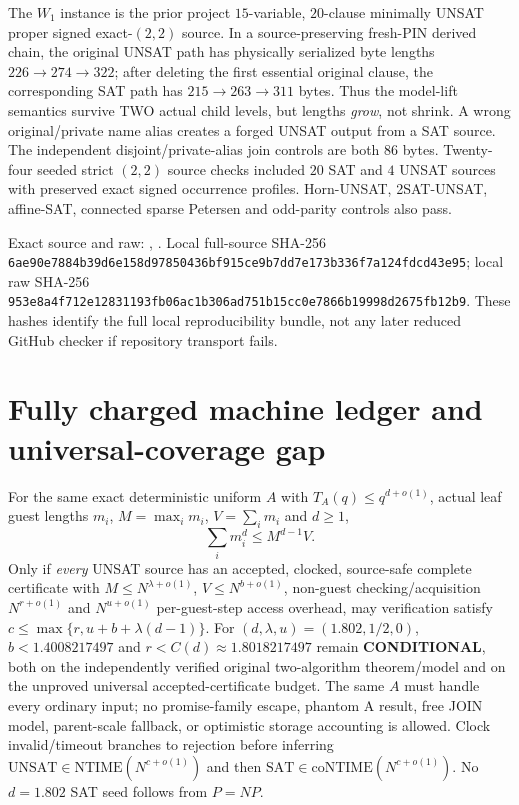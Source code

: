\documentclass[11pt]{article}
\begin{document}
The $W_1$ instance is the prior project $15$-variable,
$20$-clause minimally UNSAT proper signed exact-$(2,2)$
source. In a source-preserving fresh-PIN derived chain,
the original UNSAT path has physically serialized byte
lengths $226\to274\to322$; after deleting the first
essential original clause, the corresponding SAT path
has $215\to263\to311$ bytes. Thus the model-lift
semantics survive TWO actual child levels, but lengths
\emph{grow}, not shrink. A wrong original/private name
alias creates a forged UNSAT output from a SAT source.
The independent disjoint/private-alias join controls are
both $86$ bytes. Twenty-four seeded strict $(2,2)$
source checks included $20$ SAT and $4$ UNSAT sources
with preserved exact signed occurrence profiles.
Horn-UNSAT, 2SAT-UNSAT, affine-SAT, connected sparse
Petersen and odd-parity controls also pass.

Exact source and raw:
,
.
Local full-source SHA-256 \texttt{6ae90e7884b39d6e158d97850436bf915ce9b7dd7e173b336f7a124fdcd43e95};
local raw SHA-256 \texttt{953e8a4f712e12831193fb06ac1b306ad751b15cc0e7866b19998d2675fb12b9}.
These hashes identify the full local reproducibility bundle, not any
later reduced GitHub checker if repository transport fails.

\section{Fully charged machine ledger and universal-coverage gap}
For the same exact deterministic uniform $A$ with
$T_A(q)\le q^{d+o(1)}$, actual leaf guest lengths $m_i$,
$M=\max_i m_i$, $V=\sum_i m_i$ and $d\ge1$,
\[
\sum_i m_i^d\le M^{d-1}V.
\]
Only if \emph{every} UNSAT source has an accepted, clocked,
source-safe complete certificate with
$M\le N^{\lambda+o(1)}$, $V\le N^{b+o(1)}$,
non-guest checking/acquisition $N^{r+o(1)}$
and $N^{u+o(1)}$ per-guest-step access overhead,
may verification satisfy
$c\le\max\{r,u+b+\lambda(d-1)\}$.
For $(d,\lambda,u)=(1.802,1/2,0)$,
$b<1.4008217497$ and $r<C(d)\approx1.8018217497$
remain \textbf{CONDITIONAL}, both on the independently
verified original two-algorithm theorem/model and on the
unproved universal accepted-certificate budget. The same
$A$ must handle every ordinary input; no promise-family
escape, phantom A result, free JOIN model, parent-scale
fallback, or optimistic storage accounting is allowed.
Clock invalid/timeout branches to rejection before inferring
$\mathrm{UNSAT}\in\mathrm{NTIME}(N^{c+o(1)})$ and then
$\mathrm{SAT}\in\mathrm{coNTIME}(N^{c+o(1)})$.
No $d=1.802$ SAT seed follows from $P=NP$.
\end{document}
